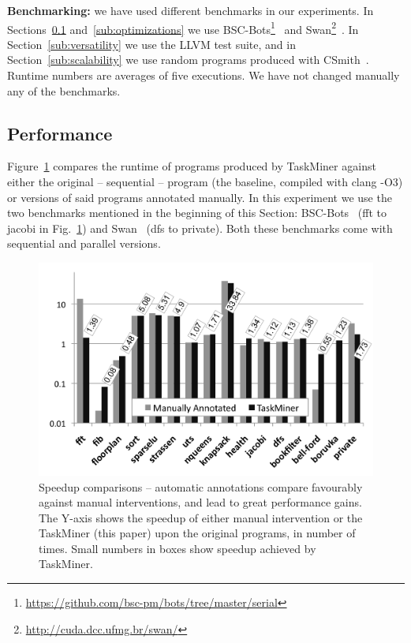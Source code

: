 \documentclass[sigplan,10pt,review,anonymous]{acmart}
\newcommand\Taskminer{\mbox{\textsf{TaskMiner}}}
\begin{document}
\noindent
\textbf{Benchmarking:}
we have used different benchmarks in our experiments.
In Sections~\ref{sub:performance} and~\ref{sub:optimizations} we use
\textsf{BSC-Bots}\footnote{\url{https://github.com/bsc-pm/bots/tree/master/serial}}~\cite{Duran09} and
\textsf{Swan}\footnote{\url{http://cuda.dcc.ufmg.br/swan/}}~\cite{Moreira17}.
In Section~\ref{sub:versatility} we use the LLVM test suite, and in
Section~\ref{sub:scalability} we use random programs produced with
\textsf{CSmith}~\cite{Yang11}.
Runtime numbers are averages of five executions.
We have not changed manually any of the benchmarks.

\subsection{Performance}
\label{sub:performance}

Figure~\ref{fig:TM_Performance} compares the runtime of programs produced by
\Taskminer{} against either the original -- sequential -- program (the baseline,
compiled with \textsf{clang} -O3)
or versions of said programs annotated manually.
In this experiment we use the two benchmarks mentioned in the beginning of this
Section: \textsf{BSC-Bots}~\cite{Duran09} (\textsf{fft} to \textsf{jacobi}
in Fig.~\ref{fig:TM_Performance}) and \textsf{Swan}~\cite{Moreira17}
(\textsf{dfs} to \textsf{private}).
Both these benchmarks come with sequential and parallel versions.

\begin{figure}[h]
\begin{center}
\includegraphics[width=1\columnwidth]{images/TM_Performance}
\caption{Speedup comparisons -- automatic annotations compare favourably against
manual interventions, and lead to great performance gains.
The Y-axis shows the speedup of either manual intervention or the \Taskminer{}
(this paper) upon the original programs, in number of times.
Small numbers in boxes show speedup achieved by \Taskminer.}
\label{fig:TM_Performance}
\end{center}
\end{figure}
\end{document}
